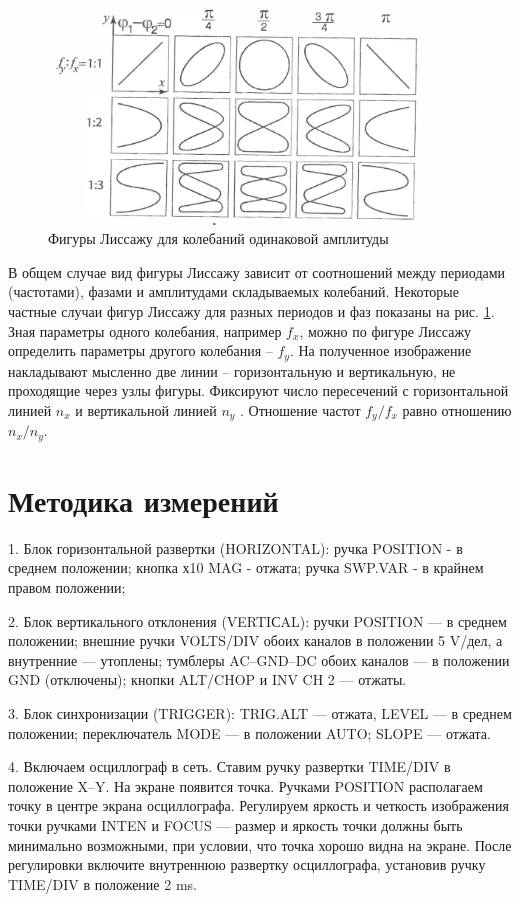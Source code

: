 \documentclass[a4paper,12pt]{article} %
\begin{document}
	\begin{figure}
		\includegraphics[width=10cm]{l_prim.png}
		\caption{Фигуры Лиссажу для колебаний одинаковой амплитуды}
		\label{l_prim}
	\end{figure}
	
	В общем случае вид фигуры Лиссажу зависит от соотношений между периодами (частотами), фазами и амплитудами складываемых колебаний. Некоторые частные случаи фигур Лиссажу для разных периодов и фаз показаны на рис. \ref{l_prim}. Зная параметры одного колебания, 
	например $ f_x $, можно по фигуре Лиссажу определить параметры другого колебания -- $ f_y $. На полученное изображение накладывают мысленно две линии -- горизонтальную и вертикальную, не проходящие через узлы фигуры. Фиксируют число пересечений с горизонтальной линией $ n_x $ и вертикальной линией $ n_y $ . Отношение частот $ f_y/f_x $ равно отношению $ n_x/n_y $. 
	

	\section{Методика измерений}
		 \par 1. Блок горизонтальной развертки (HORIZONTAL): ручка POSITION -  в среднем положении; кнопка х10 MAG - отжата; ручка SWP.VAR - в крайнем правом положении;
		 \par 2. Блок вертикального отклонения (VERTIСAL): ручки POSITION — в среднем положении; внешние ручки VOLTS/DIV обоих каналов в положении 5 V/дел, а внутренние — утоплены; тумблеры AC–GND–DC обоих каналов — в положении GND (отключены); кнопки ALT/CHOP и INV CH 2 — отжаты.
		 \par 3. Блок синхронизации (TRIGGER): TRIG.ALT — отжата, LEVEL — в среднем положении; переключатель MODE — в положении AUTO; SLOPE — отжата.
		 \par 4. Включаем осциллограф в сеть. Ставим ручку развертки
		TIME/DIV в положение X–Y. На экране появится точка. Ручками POSITION располагаем точку в центре экрана осциллографа. Регулируем яркость и четкость изображения точки ручками INTEN и FOCUS — размер и яркость точки должны быть минимально возможными, при условии, что точка хорошо видна на экране. После регулировки включите внутреннюю развертку осциллографа, установив ручку TIME/DIV в положение 2 ms.	
\end{document}
